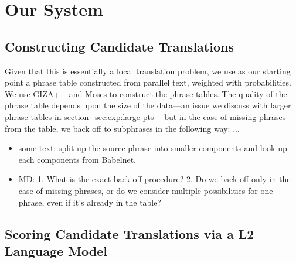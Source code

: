 \documentclass[11pt]{article}
\begin{document}
\section{Our  System}
\label{sec:system}

\subsection{Constructing Candidate Translations}
\label{sec:candidates}

Given that this is essentially a local translation problem, we use as our starting point a phrase table constructed from parallel text, weighted with probabilities.  We use GIZA++ \cite{och:ney:00} and Moses \cite{koehn:hoang:ea:07} to construct the phrase tables.  The quality of the phrase table depends upon the size of the data---an issue we discuss with larger phrase tables in section~\ref{sec:exp:large-pts}---but in the case of missing phrases from the table, we back off to subphrases in the following way: ...

\begin{itemize}
\item some text: split up the source phrase into smaller components
  and look up each components from Babelnet.
\item MD: 1. What is the exact back-off procedure? 2. Do we back off
  only in the case of missing phrases, or do we consider multiple
  possibilities for one phrase, even if it’s already in the table?
\end{itemize}



\subsection{Scoring Candidate Translations via a L2 Language Model}
\label{sec:l2model}
\end{document}
